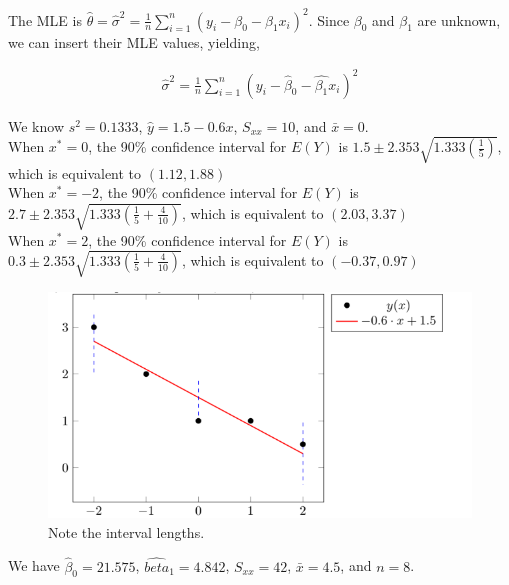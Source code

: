 \documentclass[12pt]{article}
\newenvironment{problem}[2][Problem]{\begin{trivlist}
\item[\hskip \labelsep {\bfseries #1}\hskip \labelsep {\bfseries #2.}]}{\end{trivlist}}
\begin{document}
The MLE is $\hat{\theta} = \hat{\sigma}^2 = \frac{1}{n}\sum_{i=1}^{n}(y_i - \beta_0 - \beta_1x_i)^2$. Since $\beta_0$ and $\beta_1$ are unknown, we can insert their MLE values, yielding,

\begin{align*}
	\hat{\sigma}^2 = \frac{1}{n}\sum_{i=1}^{n}(y_i - \hat{\beta}_0 - \hat{\beta_1}x_i)^2
\end{align*}

\begin{problem}{11.38}
\end{problem}

We know $s^2 = 0.1333$, $\hat{y} = 1.5 - 0.6x$, $S_{xx} = 10$, and $\bar{x} = 0$.\\

When $x^* = 0$, the 90\% confidence interval for $E(Y)$ is $1.5 \pm 2.353\sqrt{1.333(\frac{1}{5})}$, which is equivalent to $(1.12, 1.88)$\\

When $x^* = -2$, the 90\% confidence interval for $E(Y)$ is $2.7 \pm 2.353\sqrt{1.333(\frac{1}{5} + \frac{4}{10})}$, which is equivalent to $(2.03, 3.37)$\\

When $x^* = 2$, the 90\% confidence interval for $E(Y)$ is $0.3 \pm 2.353\sqrt{1.333(\frac{1}{5} + \frac{4}{10})}$, which is equivalent to $(-0.37, 0.97)$

\begin{figure}[H]
	\centering
	\includegraphics[width=\linewidth]{Graph.png}
	\caption{Note the interval lengths.}
	\label{fig:pairs}
\end{figure}

\begin{problem}{11.44}
\end{problem}

We have $\hat{\beta}_0 = 21.575$, $\hat{beta}_1 = 4.842$, $S_{xx} = 42$, $\bar{x} = 4.5$, and $n = 8$.\\
\end{document}
